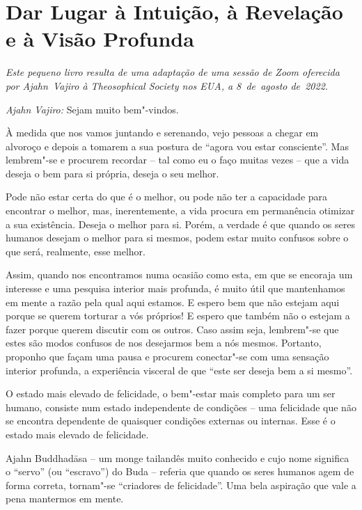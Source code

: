 \chapter{Dar Lugar à Intuição, à Revelação e à Visão Profunda}

{\centering
\centering\itshape
Este pequeno livro resulta de uma adaptação de uma sessão de Zoom oferecida por Ajahn~Vajiro
à Theosophical Society nos EUA, a 8~de~agosto de~2022.
\par}

\bigskip

\emph{Ajahn Vajiro:} Sejam muito bem"-vindos.

À medida que nos vamos juntando e serenando, vejo pessoas a chegar em alvoroço e
depois a tomarem a sua postura de ``agora vou estar consciente''. Mas lembrem"-se
e procurem recordar -- tal como eu o faço muitas vezes -- que a vida deseja o
bem para si própria, deseja o seu melhor.

Pode não estar certa do que é o melhor, ou pode não ter a capacidade para
encontrar o melhor, mas, inerentemente, a vida procura em permanência otimizar a
sua existência. Deseja o melhor para si. Porém, a verdade é que quando os seres
humanos desejam o melhor para si mesmos, podem estar muito confusos sobre o que
será, realmente, esse melhor.

Assim, quando nos encontramos numa ocasião como esta, em que se encoraja um
interesse e uma pesquisa interior mais profunda, é muito útil que mantenhamos em
mente a razão pela qual aqui estamos. E espero bem que não estejam aqui porque
se querem torturar a vós próprios! E espero que também não o estejam a fazer
porque querem discutir com os outros. Caso assim seja, lembrem"-se que estes são
modos confusos de nos desejarmos bem a nós mesmos. Portanto, proponho que façam
uma pausa e procurem conectar"-se com uma sensação interior profunda, a
experiência visceral de que ``este ser deseja bem a si mesmo''.

O estado mais elevado de felicidade, o bem"-estar mais completo para um
ser humano, consiste num estado independente de condições -- uma felicidade que
não se encontra dependente de quaisquer condições externas ou internas. Esse é o
estado mais elevado de felicidade.

Ajahn Buddhadāsa -- um monge tailandês muito conhecido e cujo nome significa o
``servo'' (ou ``escravo'') do Buda -- referia que quando os seres humanos agem
de forma correta, tornam"-se ``criadores de felicidade''. Uma bela aspiração que
vale a pena mantermos em mente.

